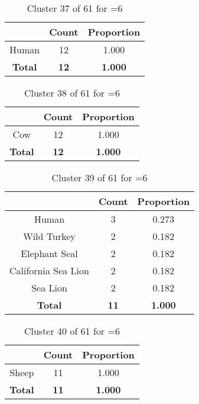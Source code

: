 \begin{table}[ht!]
\centering
\begin{tabular}{|c|c|c|}
\hline
\bf \Spec{} &\bf Count &\bf Proportion\\ \hline \hline
Human & 12 & 1.000\\ \hline
\hline
\bf Total & \bf 12 & \bf 1.000\\ \hline
\end{tabular}
\label{tab:cluster:37:6}
\caption{Cluster 37 of 61 for \minneigh{}=6}
\end{table}

\begin{table}[ht!]
\centering
\begin{tabular}{|c|c|c|}
\hline
\bf \Spec{} &\bf Count &\bf Proportion\\ \hline \hline
Cow & 12 & 1.000\\ \hline
\hline
\bf Total & \bf 12 & \bf 1.000\\ \hline
\end{tabular}
\label{tab:cluster:38:6}
\caption{Cluster 38 of 61 for \minneigh{}=6}
\end{table}

\begin{table}[ht!]
\centering
\begin{tabular}{|c|c|c|}
\hline
\bf \Spec{} &\bf Count &\bf Proportion\\ \hline \hline
Human & 3 & 0.273\\ \hline
Wild Turkey & 2 & 0.182\\ \hline
Elephant Seal & 2 & 0.182\\ \hline
California Sea Lion & 2 & 0.182\\ \hline
Sea Lion & 2 & 0.182\\ \hline
\hline
\bf Total & \bf 11 & \bf 1.000\\ \hline
\end{tabular}
\label{tab:cluster:39:6}
\caption{Cluster 39 of 61 for \minneigh{}=6}
\end{table}

\clearpage
\begin{table}[ht!]
\centering
\begin{tabular}{|c|c|c|}
\hline
\bf \Spec{} &\bf Count &\bf Proportion\\ \hline \hline
Sheep & 11 & 1.000\\ \hline
\hline
\bf Total & \bf 11 & \bf 1.000\\ \hline
\end{tabular}
\label{tab:cluster:40:6}
\caption{Cluster 40 of 61 for \minneigh{}=6}
\end{table}

